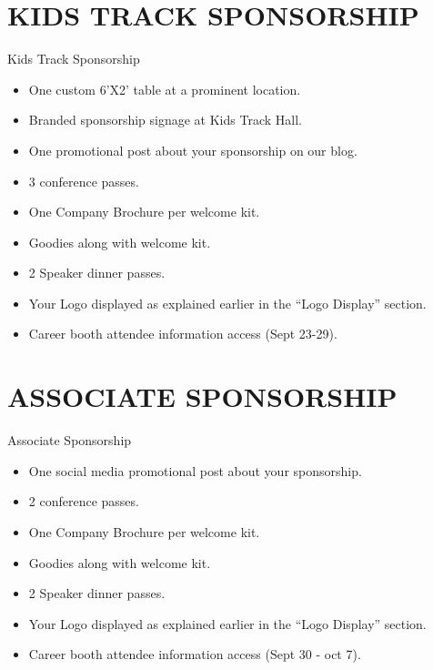 \documentclass[10pt, compress, aspectratio=169]{beamer}
\begin{document}
\section{KIDS TRACK SPONSORSHIP}
\begin{frame}{Kids Track Sponsorship}
    \begin{itemize}
        \item One custom 6’X2’ table at a prominent location.
        \item Branded sponsorship signage at Kids Track Hall.
        \item One promotional post about your sponsorship on our blog.
        \item 3 conference passes.
        \item One Company Brochure per welcome kit.
        \item Goodies along with welcome kit.
        \item 2 Speaker dinner passes.
        \item Your Logo displayed as explained earlier in the “Logo Display” section.
        \item Career booth attendee information access (Sept 23-29).
    \end{itemize}
\end{frame}


\section{ASSOCIATE SPONSORSHIP}
\begin{frame}{Associate Sponsorship}
\begin{itemize}
    \item One social media promotional post about your sponsorship.
    \item 2 conference passes.
    \item One Company Brochure per welcome kit.
    \item Goodies along with welcome kit.
    \item 2 Speaker dinner passes.
    \item Your Logo displayed as explained earlier in the “Logo Display” section.
    \item Career booth attendee information access (Sept 30 - oct 7).
\end{itemize}
\end{frame}
\end{document}
